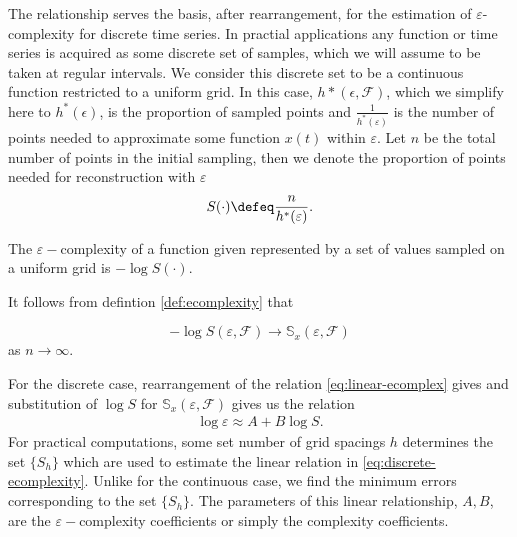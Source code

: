 \documentclass[11pt ]{article}
\begin{document}
  The relationship serves the basis, after rearrangement, 
  for the estimation of $\varepsilon$-complexity for 
  discrete time series.
  In practial applications any function or time series 
  is acquired as some discrete set of samples, which we
  will assume to be taken at regular intervals. We 
  consider this discrete set to be a continuous function
  restricted to a uniform grid. In this case, 
  $h*(\epsilon, \mathcal{F})$, which we simplify here to 
  $h^*(\epsilon)$, is the proportion of sampled points
  and $\frac{1}{h^*(\varepsilon)}$ is the 
  number of points needed to approximate some function $x(t)$ within 
  $\varepsilon$. Let $n$ be the total number of points 
  in the initial sampling, then we denote the 
  proportion of points needed for reconstruction with 
  $\varepsilon$ 
  \begin{align}
     S(\cdot) \defeq \frac{n}{h^*(\varepsilon)}.
   \end{align} 
   \begin{defn}
     The $\varepsilon-$complexity of a function 
     given represented by a set of values sampled on 
     a uniform grid is $-\log S(\cdot)$.
   \end{defn}
  It follows from defintion \ref{def:ecomplexity} that
  \begin{prop}
    \[
      -\log S(\varepsilon, \mathcal{F}) \to \mathbb{S}_x(\varepsilon, \mathcal{F}) 
    \]
    as $n \to \infty$.
  \end{prop}
  For the discrete case, rearrangement of the relation \ref{eq:linear-ecomplex} gives and substitution of $\log S$ for $\mathbb{S}_x(\varepsilon, \mathcal{F})$ gives us the relation
  \begin{align}\label{eq:discrete-ecomplexity}
     \log \varepsilon  \approx A + B \log S.
   \end{align} 
  For practical computations, some set number of grid spacings 
  $h$ determines the set $\{ S_h \}$ which are used to 
  estimate the linear relation in \ref{eq:discrete-ecomplexity}. 
  Unlike for the continuous case, we find the minimum errors 
  corresponding to the set $\{ S_h \}$.
  The parameters of this linear relationship, $A, B$, are the 
  $\varepsilon-$complexity coefficients or simply the  
  complexity coefficients. 
\end{document}
